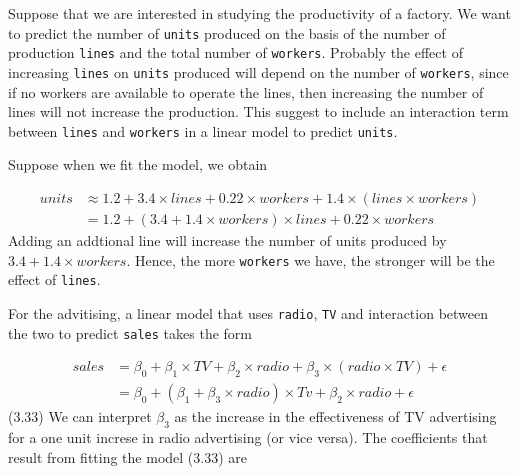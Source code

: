 \documentclass[
  letterpaper,
  DIV=11,
  numbers=noendperiod]{scrreprt}
\begin{document}
\begin{tcolorbox}[enhanced jigsaw, leftrule=.75mm, bottomtitle=1mm, opacityback=0, rightrule=.15mm, colbacktitle=quarto-callout-note-color!10!white, opacitybacktitle=0.6, left=2mm, toptitle=1mm, colback=white, titlerule=0mm, breakable, toprule=.15mm, title=\textcolor{quarto-callout-note-color}{\faInfo}\hspace{0.5em}{Productivy of a factory}, coltitle=black, bottomrule=.15mm, arc=.35mm, colframe=quarto-callout-note-color-frame]

Suppose that we are interested in studying the productivity of a
factory. We want to predict the number of \texttt{units} produced on the
basis of the number of production \texttt{lines} and the total number of
\texttt{workers}. Probably the effect of increasing \texttt{lines} on
\texttt{units} produced will depend on the number of \texttt{workers},
since if no workers are available to operate the lines, then increasing
the number of lines will not increase the production. This suggest to
include an interaction term between \texttt{lines} and \texttt{workers}
in a linear model to predict \texttt{units}.

Suppose when we fit the model, we obtain

\[
\begin{align}
units &\approx 1.2 + 3.4 \times lines + 0.22 \times workers + 1.4 \times (lines \times workers) \\
&= 1.2 + (3.4 + 1.4 \times workers) \times lines + 0.22 \times workers
\end{align}
\] Adding an addtional line will increase the number of units produced
by \(3.4 + 1.4 \times workers\). Hence, the more \texttt{workers} we
have, the stronger will be the effect of \texttt{lines}.

\end{tcolorbox}

For the advitising, a linear model that uses \texttt{radio}, \texttt{TV}
and interaction between the two to predict \texttt{sales} takes the form

\[
\begin{align}
sales &= \beta_0 + \beta_1 \times TV + \beta_2 \times radio + \beta_3 \times(radio \times TV) + \epsilon \\
&= \beta_0 + (\beta_1 + \beta_3 \times radio)\times Tv + \beta_2 \times radio + \epsilon
\end{align}
\] (3.33) We can interpret \(\beta_3\) as the increase in the
effectiveness of TV advertising for a one unit increse in radio
advertising (or vice versa). The coefficients that result from fitting
the model (3.33) are
\end{document}
